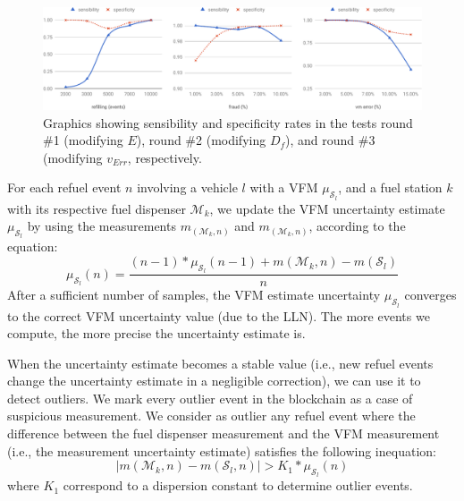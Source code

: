 \documentclass[sigplan]{acmart}
\begin{document}
\begin{figure}[!t]
\centering
\includegraphics[width=.9\textwidth]{lln}
\caption{Graphics showing sensibility and specificity rates in the tests round \#1 (modifying $E$), round \#2 (modifying $D_f$), and round \#3 (modifying $v_{Err}$, respectively.}
\label{f:lln}
\end{figure}

For each refuel event $n$ involving a vehicle $l$ with a VFM $\mu_{\mathcal{S}_l}$, and a fuel station $k$ with its respective fuel dispenser $\mathcal{M}_k$, we update the VFM uncertainty estimate $\mu_{\mathcal{S}_l}$ by using the measurements $m_(\mathcal{M}_k,n)$ and $m_(\mathcal{M}_k,n)$, according to the equation:
\begin{equation}
    \mu_{\mathcal{S}_l}(n) = \frac {(n - 1) * \mu_{\mathcal{S}_l}(n - 1) + m(\mathcal{M}_k,n) - m(\mathcal{S}_l)}{n}
\end{equation}
After a sufficient number of samples, the VFM estimate uncertainty $\mu_{\mathcal{S}_l}$ converges to the correct VFM uncertainty value (due to the LLN).
The more events we compute, the more precise the uncertainty estimate is.

When the uncertainty estimate becomes a stable value (i.e., new refuel events change the uncertainty estimate in a negligible correction), we can use it to detect outliers.
We mark every outlier event in the blockchain as a case of suspicious measurement.
We consider as outlier any refuel event where the difference between the fuel dispenser measurement and the VFM measurement (i.e., the measurement uncertainty estimate) satisfies the following inequation:
\begin{equation} \left| m(\mathcal{M}_k,n) - m(\mathcal{S}_l,n) \right| > K_1 * \mu_{\mathcal{S}_l}(n) \end{equation}
where $K_1$ correspond to a dispersion constant to determine outlier events.
\end{document}
